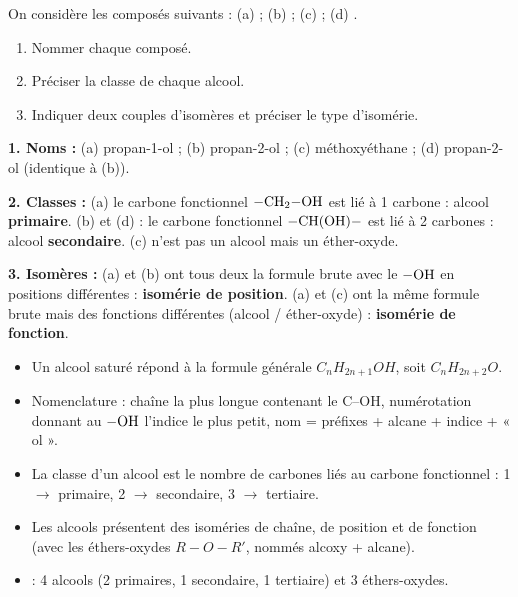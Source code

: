 \documentclass[11pt]{article}
\newcommand{\cle}[1]{{\popxbold\color{popdark}#1}}
\begin{document}
\begin{exercice}
On considère les composés suivants : (a)  ; (b)  ; (c)  ; (d) .
\begin{enumerate}
\item Nommer chaque composé.
\item Préciser la classe de chaque alcool.
\item Indiquer deux couples d'isomères et préciser le type d'isomérie.
\end{enumerate}
\end{exercice}

\begin{corrige}[Exercice 1]
\textbf{1. Noms :} (a) propan-1-ol ; (b) propan-2-ol ; (c) méthoxyéthane ; (d) propan-2-ol (identique à (b)).\par
\textbf{2. Classes :} (a) le carbone fonctionnel $-\ce{CH2-OH}$ est lié à 1 carbone : alcool \textbf{primaire}. (b) et (d) : le carbone fonctionnel $-\ce{CH(OH)}-$ est lié à 2 carbones : alcool \textbf{secondaire}. (c) n'est pas un alcool mais un éther-oxyde.\par
\textbf{3. Isomères :} (a) et (b) ont tous deux la formule brute  avec le $-\ce{OH}$ en positions différentes : \textbf{isomérie de position}. (a) et (c) ont la même formule brute  mais des fonctions différentes (alcool / éther-oxyde) : \textbf{isomérie de fonction}.
\end{corrige}

\begin{aretenir}
\begin{itemize}
\item Un alcool saturé répond à la formule générale $C_nH_{2n+1}OH$, soit $C_nH_{2n+2}O$.
\item Nomenclature : chaîne la plus longue contenant le C--OH, numérotation donnant au $-\ce{OH}$ l'indice le plus petit, nom = préfixes + alcane + indice + « ol ».
\item La \cle{classe} d'un alcool est le nombre de carbones liés au carbone fonctionnel : 1 $\to$ primaire, 2 $\to$ secondaire, 3 $\to$ tertiaire.
\item Les alcools présentent des isoméries de chaîne, de position et de fonction (avec les éthers-oxydes $R-O-R'$, nommés alcoxy + alcane).
\item {} : 4 alcools (2 primaires, 1 secondaire, 1 tertiaire) et 3 éthers-oxydes.
\end{itemize}
\end{aretenir}
\end{document}
